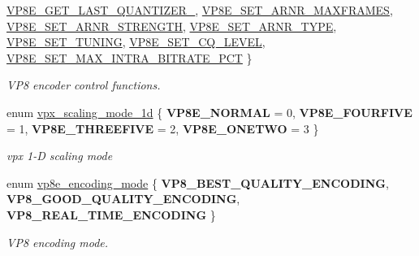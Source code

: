 \begin{DoxyCompactItemize}
\hyperlink{group__vp8__encoder_gga6deae3d561c838952552c3d3756322ecad2cfc9712d2eab30b5a59a60d0daaade}{\-V\-P8\-E\-\_\-\-G\-E\-T\-\_\-\-L\-A\-S\-T\-\_\-\-Q\-U\-A\-N\-T\-I\-Z\-E\-R\-\_}, 
\hyperlink{group__vp8__encoder_gga6deae3d561c838952552c3d3756322eca628d73f1a69fadd8aa57e0dfef578da8}{\-V\-P8\-E\-\_\-\-S\-E\-T\-\_\-\-A\-R\-N\-R\-\_\-\-M\-A\-X\-F\-R\-A\-M\-E\-S}, 
\hyperlink{group__vp8__encoder_gga6deae3d561c838952552c3d3756322eca0a8c40a768af935ae73faa53355c3244}{\-V\-P8\-E\-\_\-\-S\-E\-T\-\_\-\-A\-R\-N\-R\-\_\-\-S\-T\-R\-E\-N\-G\-T\-H}, 
\*
\hyperlink{group__vp8__encoder_gga6deae3d561c838952552c3d3756322eca4e0a0af58670012026c213083cd48f3a}{\-V\-P8\-E\-\_\-\-S\-E\-T\-\_\-\-A\-R\-N\-R\-\_\-\-T\-Y\-P\-E}, 
\hyperlink{group__vp8__encoder_gga6deae3d561c838952552c3d3756322eca126ccbe7bde63b59cec5ea68a82dd498}{\-V\-P8\-E\-\_\-\-S\-E\-T\-\_\-\-T\-U\-N\-I\-N\-G}, 
\hyperlink{group__vp8__encoder_gga6deae3d561c838952552c3d3756322ecacd4f5b730bddb9788c3d0b82218ec503}{\-V\-P8\-E\-\_\-\-S\-E\-T\-\_\-\-C\-Q\-\_\-\-L\-E\-V\-E\-L}, 
\hyperlink{group__vp8__encoder_gga6deae3d561c838952552c3d3756322eca09c69ff4a3aabdb307d4f24027dfc4c1}{\-V\-P8\-E\-\_\-\-S\-E\-T\-\_\-\-M\-A\-X\-\_\-\-I\-N\-T\-R\-A\-\_\-\-B\-I\-T\-R\-A\-T\-E\-\_\-\-P\-C\-T}
 \}
\begin{DoxyCompactList}\small\item\em \-V\-P8 encoder control functions. \end{DoxyCompactList}\item 
enum \hyperlink{group__vp8__encoder_ga70071b1bb6cac9a1ef0ea3d8362ff94f}{vpx\-\_\-scaling\-\_\-mode\-\_\-1d} \{ {\bfseries \-V\-P8\-E\-\_\-\-N\-O\-R\-M\-A\-L} =  0, 
{\bfseries \-V\-P8\-E\-\_\-\-F\-O\-U\-R\-F\-I\-V\-E} =  1, 
{\bfseries \-V\-P8\-E\-\_\-\-T\-H\-R\-E\-E\-F\-I\-V\-E} =  2, 
{\bfseries \-V\-P8\-E\-\_\-\-O\-N\-E\-T\-W\-O} =  3
 \}
\begin{DoxyCompactList}\small\item\em vpx 1-\/\-D scaling mode \end{DoxyCompactList}\item 
enum \hyperlink{group__vp8__encoder_ga57a092f46c3afa879c237f775d4f51dd}{vp8e\-\_\-encoding\-\_\-mode} \{ {\bfseries \-V\-P8\-\_\-\-B\-E\-S\-T\-\_\-\-Q\-U\-A\-L\-I\-T\-Y\-\_\-\-E\-N\-C\-O\-D\-I\-N\-G}, 
{\bfseries \-V\-P8\-\_\-\-G\-O\-O\-D\-\_\-\-Q\-U\-A\-L\-I\-T\-Y\-\_\-\-E\-N\-C\-O\-D\-I\-N\-G}, 
{\bfseries \-V\-P8\-\_\-\-R\-E\-A\-L\-\_\-\-T\-I\-M\-E\-\_\-\-E\-N\-C\-O\-D\-I\-N\-G}
 \}
\begin{DoxyCompactList}\small\item\em \-V\-P8 encoding mode. \end{DoxyCompactList}\item 

\end{DoxyCompactItemize}
